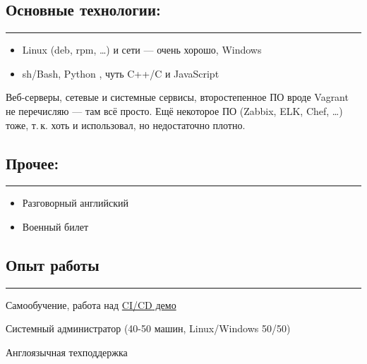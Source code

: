 \documentclass[11pt, a4paper]{article}
\newcommand{\Delimitline}{
  \vspace{-4ex}
  \textcolor[RGB]{120,120,120}{\rule{\linewidth}{1pt}}
  \vspace{-4ex}
}
\newcommand\Eng[1]{%
  \foreignlanguage{english}{#1}%
}
\begin{document}
\subsection*{Основные технологии:}
\Delimitline
\begin{itemize}
  \item \Eng{Linux (deb, rpm, \dots)} и сети — очень хорошо, \Eng{Windows}
  \item \Eng{sh/Bash, Python}, чуть \Eng{C++/C} и \Eng{JavaScript}
\end{itemize}

Веб-серверы, сетевые и системные сервисы, второстепенное ПО вроде \Eng{Vagrant} не перечисляю — там всё просто. Ещё некоторое ПО \Eng{(Zabbix, ELK, Chef, \dots)} тоже, т.\,к. хоть и использовал, но недостаточно плотно.

\subsection*{Прочее:}
\Delimitline
\begin{itemize}
  \item Разговорный английский
  \item Военный билет
\end{itemize}

\subsection*{Опыт работы}
\Delimitline
\begin{etaremune}
  \item Самообучение, работа над \href{https://github.com/bititanb/CI-CD-pipeline}{\Eng{CI/CD} демо}
  \item Системный администратор (40-50 машин, \Eng{Linux/Windows} 50/50)
  \item Англоязычная техподдержка
\end{etaremune}
\end{document}
